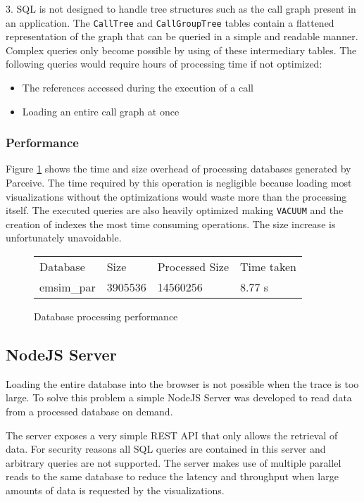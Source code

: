 \documentclass[conference]{IEEEtran}
\begin{document}
3. SQL is not designed to handle tree structures such as the call graph present in an application. The \texttt{CallTree} and \texttt{CallGroupTree} tables contain a flattened representation of the graph that can be queried in a simple and readable manner. Complex queries only become possible by using of these intermediary tables. The following queries would require hours of processing time if not optimized:

\begin{itemize}
	\item The references accessed during the execution of a call
	\item Loading an entire call graph at once
\end{itemize}

\subsubsection{Performance}

Figure \ref{parceive:procperformance} shows the time and size overhead of processing databases generated by Parceive. The time required by this operation is negligible because loading most visualizations without the optimizations would waste more than the processing itself. The executed queries are also heavily optimized making \texttt{VACUUM} and the creation of indexes the most time consuming operations. The size increase is unfortunately unavoidable.

\begin{figure}
	\centering
	\begin{tabular}{l l l l}
		Database & Size & Processed Size & Time taken \\
		emsim\_par & 3905536 & 14560256 & 8.77 s
	\end{tabular}
	\caption{Database processing performance}
	\label{parceive:procperformance}
\end{figure}

\subsection{NodeJS Server}

Loading the entire database into the browser is not possible when the trace is too large. To solve this problem a simple NodeJS Server was developed to read data from a processed database on demand.

The server exposes a very simple REST \cite{rest} API that only allows the retrieval of data. For security reasons all SQL queries are contained in this server and  arbitrary queries are not supported. The server makes use of multiple parallel reads to the same database to reduce the latency and throughput when large amounts of data is requested by the visualizations.
\end{document}
